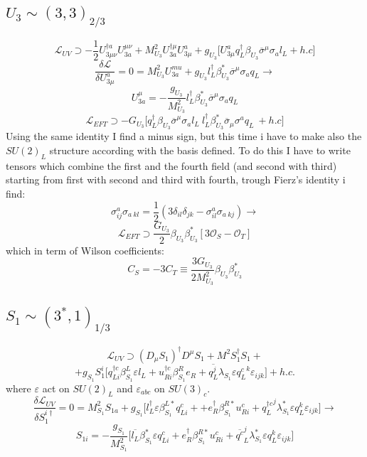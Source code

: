 \documentclass{article}
\begin{document}
\subsection{$U_3 \sim (3,3)_{2/3}$}
\[
\mathcal{L}_{UV} \supset -\frac{1}{2} U^{\dagger a}_{3\mu \nu} U_{3a}^{\mu \nu} + M^2_{U_3} U_{3a}^{\dagger\mu} U^a_{3 \mu} + g_{U_3}\big[ U_{3 \mu}^a q_L^\dagger \beta_{U_3} \overline{\sigma}^\mu \sigma_a l_L + h.c \big] 
\]
\[
\frac{\delta \mathcal{L}}{\delta U_{3 \mu}^a} =0 = M_{U_3}^2 U_{3a}^{mu} +g_{U_3} l_L^\dagger \beta^*_{U_3} \overline{\sigma}^\mu \sigma_a q_L \rightarrow
\]
\[
U^\mu_{3a} = -\frac{g_{U_3}}{M^2_{U_3}} l_L^\dagger \beta^*_{U_3} \overline{\sigma}^\mu \sigma_a q_L 
\]
\[
\mathcal{L}_{EFT} \supset -G_{U_3} \big[ q_L^\dagger \beta_{U_3} \overline{\sigma}^\mu \sigma_a l_L \ l_L^\dagger \beta^*_{U_3} \overline{\sigma}_\mu \sigma^a q_L \ + h.c \big]
\]
Using the same identity I find a minus sign, but this time i have to make also the $SU(2)_L$ structure according with the basis defined. To do this I have to write tensors which combine the first and the fourth field (and second with third) starting from first with second and third with fourth, trough Fierz's identity i find:
\[
\sigma^a_{ij} \sigma_{a \ kl} = \frac{1}{2} (3\delta_{il} \delta_{jk} - \sigma^a_{il} \sigma_{a \ kj}) \rightarrow
\]
\[
\mathcal{L}_{EFT} \supset \frac{G_{U_3}}{2} \beta_{U_3} \beta_{U_3}^*[3 \mathcal{O}_S - \mathcal{O}_T]
\]
which in term of Wilson coefficients:
\[
C_S = -3 C_T \equiv \frac{3 G_{U_3}}{2 M^2_{U_3}} \beta_{U_3} \beta_{U_3}^*
\]

\subsection{$S_1 \sim (3^*,1)_{1/3}$}
\[
\mathcal{L}_{UV} \supset (D_\mu S_1)^\dagger D^\mu S_1 + M^2 S_1^\dagger S_1 +
\]
\[
+g_{S_1} S_1^i \big[ q^{\dagger c}_{L i} \beta^L_{S_1} \varepsilon l_L + u^{\dagger c}_{R i} \beta^R_{S_1}  e_R + \overline{q^j_L} \lambda_{S_1} \varepsilon {q^{c}_L}^k \varepsilon_{ijk} \big] +h.c.
\]
where $\varepsilon$ act on $SU(2)_L$ and $\varepsilon_{abc} $ on $SU(3)_c$.
\[
\frac{\delta \mathcal{L}_{UV}}{\delta S_1^{i \dagger}} =0= M^2_{S_1} S_{1a} + g_{S_1}\big[ l_L^\dagger \varepsilon \beta^{L*}_{S_1}  q^c_{L i} + + e^\dagger_{R } \beta^{R*}_{S_1}  u^c_{R i} + {q^{\dagger c}_L}^j \lambda_{S_1}^* \varepsilon q^k_L \varepsilon_{ijk}\big] \rightarrow
\]  
\[
S_{1i} = - \frac{g_{S_1}}{M^2_{S_1}} \big[ \overline{l_L} \beta^*_{S_1} \varepsilon q^c_{L i} +  e^\dagger_{R } \beta^{R*}_{S_1} u^c_{R i} + \overline{q^c}_L^j \lambda_{S_1}^* \varepsilon q^k_L \varepsilon_{ijk}\big] 
\]
\end{document}
